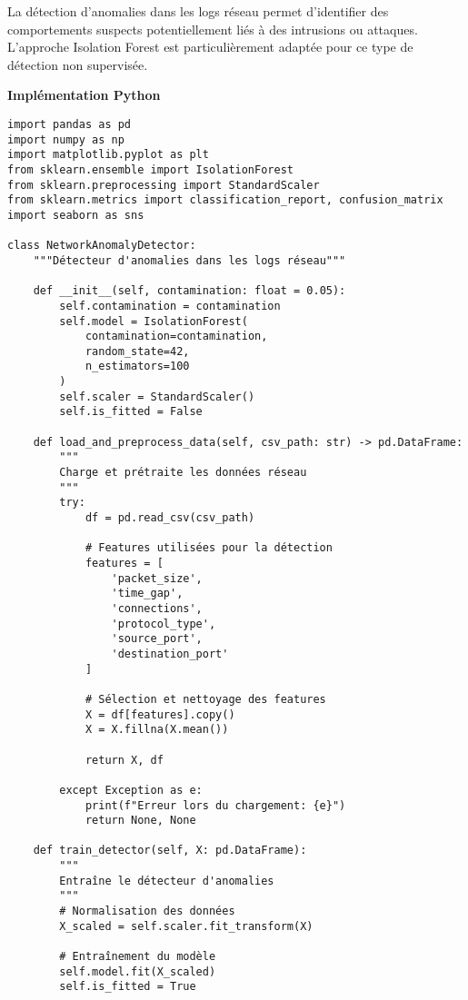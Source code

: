 \documentclass[12pt,a4paper]{article}
\begin{document}
La détection d'anomalies dans les logs réseau permet d'identifier des comportements suspects potentiellement liés à des intrusions ou attaques. L'approche Isolation Forest est particulièrement adaptée pour ce type de détection non supervisée.

\textbf{Implémentation Python}

\begin{lstlisting}[caption=Détection d'anomalies avec Isolation Forest]
import pandas as pd
import numpy as np
import matplotlib.pyplot as plt
from sklearn.ensemble import IsolationForest
from sklearn.preprocessing import StandardScaler
from sklearn.metrics import classification_report, confusion_matrix
import seaborn as sns

class NetworkAnomalyDetector:
    """Détecteur d'anomalies dans les logs réseau"""
    
    def __init__(self, contamination: float = 0.05):
        self.contamination = contamination
        self.model = IsolationForest(
            contamination=contamination,
            random_state=42,
            n_estimators=100
        )
        self.scaler = StandardScaler()
        self.is_fitted = False
    
    def load_and_preprocess_data(self, csv_path: str) -> pd.DataFrame:
        """
        Charge et prétraite les données réseau
        """
        try:
            df = pd.read_csv(csv_path)
            
            # Features utilisées pour la détection
            features = [
                'packet_size', 
                'time_gap', 
                'connections',
                'protocol_type',
                'source_port',
                'destination_port'
            ]
            
            # Sélection et nettoyage des features
            X = df[features].copy()
            X = X.fillna(X.mean())
            
            return X, df
            
        except Exception as e:
            print(f"Erreur lors du chargement: {e}")
            return None, None
    
    def train_detector(self, X: pd.DataFrame):
        """
        Entraîne le détecteur d'anomalies
        """
        # Normalisation des données
        X_scaled = self.scaler.fit_transform(X)
        
        # Entraînement du modèle
        self.model.fit(X_scaled)
        self.is_fitted = True
        

\end{lstlisting}
\end{document}
